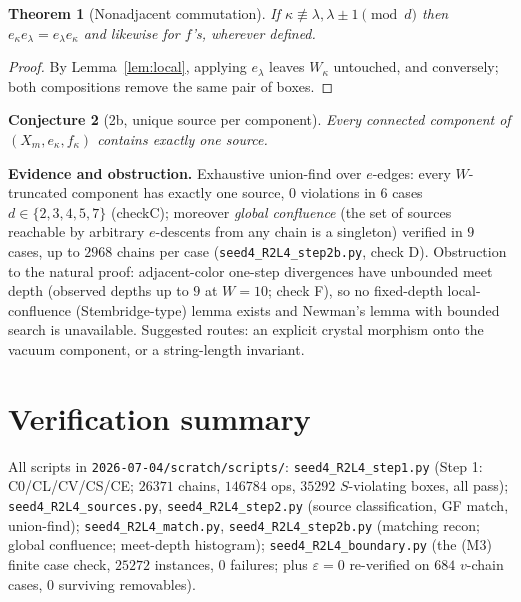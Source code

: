 \documentclass[11pt]{article}
\newtheorem{theorem}{Theorem}
\newtheorem{conjecture}[theorem]{Conjecture}
\theoremstyle{definition}
\newcommand{\eps}{\varepsilon}
\begin{document}
\begin{theorem}[Nonadjacent commutation]\label{thm:commute}
If $\kappa\not\equiv\lambda,\lambda\pm1 \pmod d$ then $e_\kappa
e_\lambda=e_\lambda e_\kappa$ and likewise for $f$'s, wherever defined.
\end{theorem}
\begin{proof}
By Lemma~\ref{lem:local}, applying $e_\lambda$ leaves $W_\kappa$ untouched,
and conversely; both compositions remove the same pair of boxes.
\end{proof}

\begin{conjecture}[2b, unique source per component]\label{conj:unique}
Every connected component of $(X_m,e_\kappa,f_\kappa)$ contains exactly one
source.
\end{conjecture}

\noindent\textbf{Evidence and obstruction.} Exhaustive union-find over
$e$-edges: every $W$-truncated component has exactly one source, $0$
violations in $6$ cases $d\in\{2,3,4,5,7\}$ (checkC); moreover \emph{global
confluence} (the set of sources reachable by arbitrary $e$-descents from any
chain is a singleton) verified in $9$ cases, up to $2968$ chains per case
(\texttt{seed4\_R2L4\_step2b.py}, check D). Obstruction to the natural proof:
adjacent-color one-step divergences have unbounded meet depth (observed
depths up to $9$ at $W=10$; check F), so no fixed-depth local-confluence
(Stembridge-type) lemma exists and Newman's lemma with bounded search is
unavailable. Suggested routes: an explicit crystal morphism onto the vacuum
component, or a string-length invariant.

\section{Verification summary}
All scripts in \texttt{2026-07-04/scratch/scripts/}:
\texttt{seed4\_R2L4\_step1.py} (Step 1: C0/CL/CV/CS/CE; $26371$ chains,
$146784$ ops, $35292$ $S$-violating boxes, all pass);
\texttt{seed4\_R2L4\_sources.py}, \texttt{seed4\_R2L4\_step2.py} (source
classification, GF match, union-find);
\texttt{seed4\_R2L4\_match.py}, \texttt{seed4\_R2L4\_step2b.py} (matching
recon; global confluence; meet-depth histogram);
\texttt{seed4\_R2L4\_boundary.py} (the (M3) finite case check, $25272$
instances, $0$ failures; plus $\eps=0$ re-verified on $684$ $v$-chain cases,
$0$ surviving removables).
\end{document}

